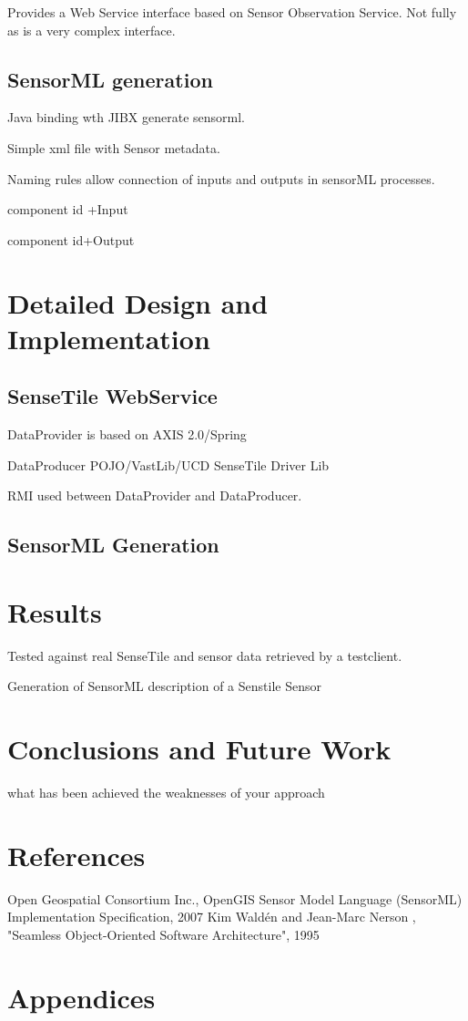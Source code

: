 \documentclass[]{final_report}
\begin{document}
Provides a Web Service interface  based on Sensor Observation Service. Not fully as is a very complex interface.

\newpage
\section{SensorML generation}

Java binding wth JIBX  generate sensorml.

Simple xml file with Sensor metadata.

Naming rules allow connection of inputs and outputs
in sensorML processes.

 component id +Input

 component id+Output

\chapter{ Detailed Design and Implementation}

\section{SenseTile WebService}

DataProvider is based on AXIS 2.0/Spring

DataProducer POJO/VastLib/UCD SenseTile Driver Lib

RMI used between DataProvider and DataProducer.

\section{SensorML Generation}

\chapter{Results}

Tested against real SenseTile and sensor data retrieved by a testclient.

Generation of SensorML description of a Senstile Sensor

\chapter{ Conclusions and Future Work}

what has been achieved
the weaknesses of your approach

\chapter{References}
\newpage
\begin{thebibliography}{99}
Open Geospatial Consortium Inc., OpenGIS Sensor Model Language (SensorML) Implementation Specification, 2007
Kim Waldén and Jean-Marc Nerson , "Seamless Object-Oriented Software Architecture", 1995
\end{thebibliography}
\label{endpage}


\chapter{Appendices}
\end{document}
